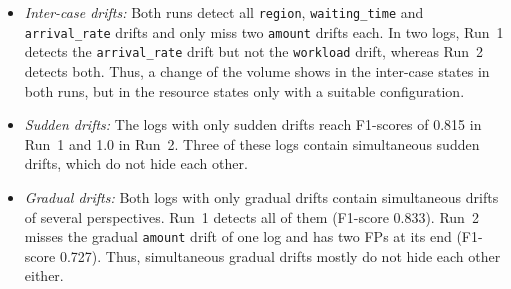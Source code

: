 \begin{itemize}
	\item \emph{Inter-case drifts:} \label{sec:eval:rheon:mixed:inter} Both runs detect all \texttt{region}, \texttt{waiting\_time} and \texttt{arrival\_rate} drifts and only miss two \texttt{amount} drifts each. In two logs, Run~1 detects the \texttt{arrival\_rate} drift but not the \texttt{workload} drift, whereas Run~2 detects both. Thus, a change of the volume shows in the inter-case states in both runs, but in the resource states only with a suitable configuration.
	\item \emph{Sudden drifts:} \label{sec:eval:rheon:mixed:sudden} The logs with only sudden drifts reach F1-scores of 0.815 in Run~1 and 1.0 in Run~2. Three of these logs contain simultaneous sudden drifts, which do not hide each other.
	\item \emph{Gradual drifts:} \label{sec:eval:rheon:mixed:gradual} Both logs with only gradual drifts contain simultaneous drifts of several perspectives. Run~1 detects all of them (F1-score 0.833). Run~2 misses the gradual \texttt{amount} drift of one log and has two FPs at its end (F1-score 0.727). Thus, simultaneous gradual drifts mostly do not hide each other either.
\end{itemize}

